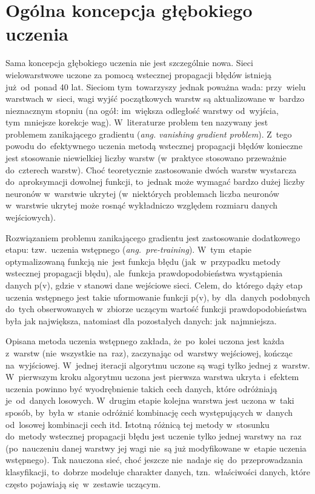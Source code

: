 \section{Ogólna koncepcja głębokiego uczenia}
Sama koncepcja głębokiego uczenia nie jest szczególnie nowa. Sieci
wielowarstwowe uczone za pomocą wstecznej propagacji błędów istnieją
już~od~ponad 40 lat. Sieciom tym~towarzyszy jednak poważna wada: przy~wielu
warstwach w~sieci, wagi wyjść początkowych warstw są aktualizowane w~bardzo
nieznacznym stopniu (na ogół: im~większa odległość warstwy od~wyjścia,
tym~mniejsze korekcje wag). W~literaturze problem ten nazywany jest problemem
zanikającego gradientu (\textit{ang. vanishing gradient problem}). Z~tego
powodu do~efektywnego uczenia metodą wstecznej propagacji błędów konieczne jest
stosowanie niewielkiej liczby warstw (w~praktyce stosowano przeważnie
do~czterech warstw). Choć teoretycznie zastosowanie dwóch warstw
wystarcza do~aproksymacji dowolnej funkcji, to~jednak może wymagać bardzo dużej
liczby neuronów w~warstwie ukrytej (w~niektórych problemach liczba neuronów w~warstwie ukrytej może rosnąć
wykładniczo względem rozmiaru danych wejściowych).

Rozwiązaniem problemu zanikającego gradientu jest zastosowanie dodatkowego
etapu: tzw.~uczenia wstępnego (\textit{ang.~pre-training}). W~tym~etapie
optymalizowaną funkcją nie~jest funkcja błędu (jak~w~przypadku metody wstecznej
propagacji błędu), ale~funkcja prawdopodobieństwa wystąpienia danych p(v),
gdzie v stanowi dane wejściowe sieci. Celem, do~którego dąży etap uczenia
wstępnego jest takie uformowanie funkcji p(v), by~dla~danych podobnych do~tych obserwowanych w~zbiorze
uczącym wartość funkcji prawdopodobieństwa była jak największa, natomiast dla pozostałych danych:
jak~najmniejsza.

Opisana metoda uczenia wstępnego zakłada, że~po~kolei uczona jest każda
z~warstw (nie~wszystkie na~raz), zaczynając od~warstwy wejściowej, kończąc
na~wyjściowej. W~jednej iteracji algorytmu uczone są wagi tylko jednej z~warstw.
W~pierwszym kroku algorytmu uczona jest pierwsza warstwa ukryta i~efektem
uczenia powinno być wyodrębnienie takich cech danych, które odróżniają
je~od~danych losowych. W~drugim etapie kolejna warstwa jest uczona w~taki
sposób, by~była w~stanie odróżnić kombinację cech występujących w~danych
od~losowej kombinacji cech itd. Istotną różnicą tej metody w~stosunku do~metody
wstecznej propagacji błędu jest uczenie tylko jednej warstwy na~raz
(po~nauczeniu danej warstwy jej wagi nie~są już modyfikowane w~etapie uczenia
wstępnego). Tak nauczona sieć, choć jeszcze nie~nadaje się~do~przeprowadzania
klasyfikacji, to~dobrze modeluje charakter danych, tzn.~właściwości danych,
które często pojawiają się~w~zestawie uczącym.


